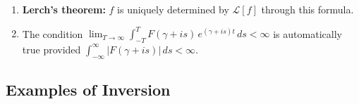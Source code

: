 \begin{remark}
\begin{enumerate}
\item \textbf{Lerch's theorem:} $f$ is uniquely determined by $\mathcal{L}[f]$ through this formula.
\item The condition $\lim_{T \to \infty}\int_{-T}^{T} F(\gamma + is)\,e^{(\gamma + is)t}\,ds < \infty$ is automatically true provided $\int_{-\infty}^{\infty} |F(\gamma + is)|\,ds < \infty$.
\end{enumerate}
\end{remark}

\subsection{Examples of Inversion}

